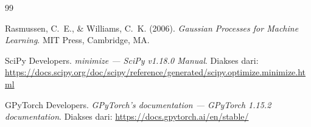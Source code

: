 \documentclass[11pt,a4paper]{article}
\begin{document}
\begin{thebibliography}{99}

Rasmussen, C.~E., \& Williams, C.~K. (2006). \textit{Gaussian Processes for Machine Learning}. MIT Press, Cambridge, MA.

SciPy Developers. \textit{minimize --- SciPy v1.18.0 Manual}. Diakses dari: \url{https://docs.scipy.org/doc/scipy/reference/generated/scipy.optimize.minimize.html}

GPyTorch Developers. \textit{GPyTorch's documentation --- GPyTorch 1.15.2 documentation}. Diakses dari: \url{https://docs.gpytorch.ai/en/stable/}

\end{thebibliography}
\end{document}
